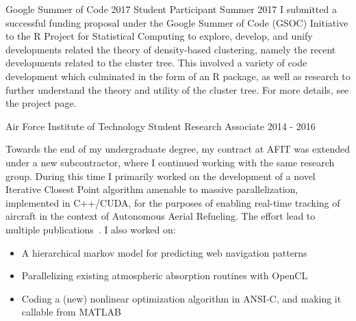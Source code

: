 \documentclass[11pt,a4paper,sans]{moderncv} %
\begin{document}

			 {Google Summer of Code 2017}
			 {Student Participant}
			 {Summer 2017}{}{\vspace{3pt} %
			 I submitted a successful funding proposal under the Google Summer of Code (GSOC) Initiative to the R Project for Statistical Computing to explore, develop, and unify developments related the theory of density-based clustering, namely the recent developments related to the cluster tree. This involved a variety of code development which culminated in the form of an R package, as well as research to further understand the theory and utility of the cluster tree. For more details, see the project page.\footnotemark 
			 } 

			 {Air Force Institute of Technology}
			 {Student Research Associate}
			 {2014 - 2016}{}{\vspace{3pt}
Towards the end of my undergraduate degree, my contract at AFIT was extended under a new subcontractor, where I continued working with the same research group. 
During this time I primarily worked on the development of a novel Iterative Closest Point algorithm amenable to massive parallelization, implemented in C++/CUDA, for the purposes of enabling real-time tracking of aircraft in the context of Autonomous Aerial Refueling. The effort lead to multiple publications~\cite{piekenbrock2016automated, robinson2016parallelized}. I also worked on:
\begin{itemize}
	\item A hierarchical markov model for predicting web navigation patterns 
	\item Parallelizing existing atmospheric absorption routines with OpenCL 
	\item Coding a (new) nonlinear optimization algorithm in ANSI-C, and making it callable from MATLAB
\end{itemize}
}
\end{document}
